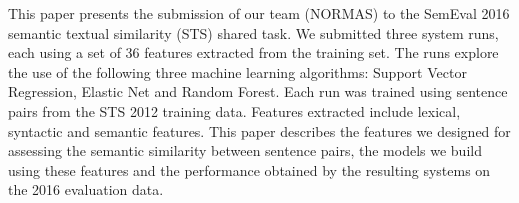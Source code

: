 This paper presents the submission of our team (NORMAS) to the SemEval 2016 semantic textual similarity (STS) shared task. We submitted three system runs, each using a set of 36 features extracted from the training set. The runs explore the use of the following three machine learning algorithms: Support Vector Regression, Elastic Net and Random Forest. Each run was trained using sentence pairs from the STS 2012 training data. Features extracted include lexical, syntactic and semantic features. This paper describes the features we designed for assessing the semantic similarity between sentence pairs, the models we build using these features and the performance obtained by the resulting systems on the 2016 evaluation data.

